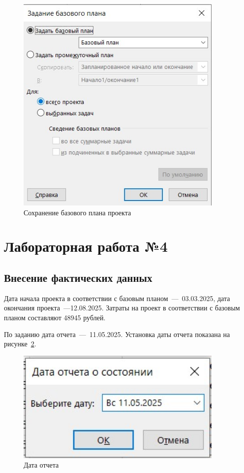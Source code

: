 \begin{figure}[H]
	\centering
	\includegraphics[width=0.9\textwidth]{img/lab3/task3/screen8.jpg}
	\caption{Сохранение базового плана проекта}
	\label{fig:screen3_8}
\end{figure}

\section{Лабораторная работа №4}

\subsection{Внесение фактических данных}

Дата начала проекта в соответствии с базовым планом~---~03.03.2025, дата окончания проекта~---12.08.2025.
Затраты на проект в соответствии с базовым планом составляют 48945 рублей. 

По заданию дата отчета~---~11.05.2025.
Установка даты отчета показана на рисунке~\ref{fig:4_screen1}.

\begin{figure}[H]
	\centering
	\includegraphics[width=0.9\textwidth]{img/lab4/screen1_report.jpg}
	\caption{Дата отчета}
	\label{fig:4_screen1}
\end{figure}

